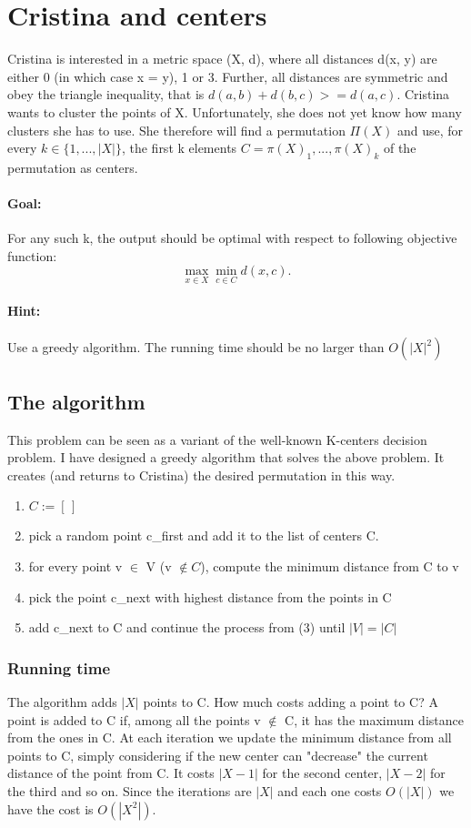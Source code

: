 \section{Cristina and centers}
Cristina is interested in a metric space (X, d), where all distances d(x, y) are
either 0 (in which case x = y), 1 or 3. Further, all distances are symmetric and obey the triangle inequality, that is $d(a, b) + d(b, c) >= d(a, c)$. Cristina wants to cluster the points of X. Unfortunately, she does not yet know how many clusters she has to use. She therefore will find a permutation $\Pi(X)$ and use, for every $k \in \{1, ..., |X|\}$, the first k elements $C =
{\pi(X)_1, ..., \pi(X)_k}$ of the permutation as centers.
\paragraph*{Goal:} For any such k, the output should be optimal with respect to following objective function:
\begin{equation}
\max_{x \in X} \min_{c \in C} d(x,c).
\end{equation}
\paragraph*{Hint:} Use a greedy algorithm. The running time should be no larger than $O(|X|^2)$

\subsection{The algorithm}
This problem can be seen as a variant of the well-known K-centers decision problem. I have designed a greedy algorithm that solves the above problem.
It creates (and returns to Cristina) the desired permutation in this way.
\begin{enumerate}
	\item $C:= [\,]$
	\item pick a random point c\_first and add it to the list of centers C.
	\item for every point v $\in$ V (v $\notin C$), compute the minimum distance from C to v 
	\item pick the point c\_next with highest distance from the points in C
	\item add c\_next to C and continue the process from (3) until $|V| = |C|$
\end{enumerate}

\subsubsection{Running time}
The algorithm adds $|X|$ points to C. How much costs adding a point to C? A point is added to C if, among all the points v $\notin$ C, it has the maximum distance from the ones in C. At each iteration we update the minimum distance from all points to C, simply considering if the new center can "decrease" the current distance of the point from C. It costs $|X - 1|$ for the second center, $|X - 2|$ for the third and so on. Since the iterations are $|X|$ and each one costs $O(|X|)$ we have the cost is $O(|X^2|)$.
